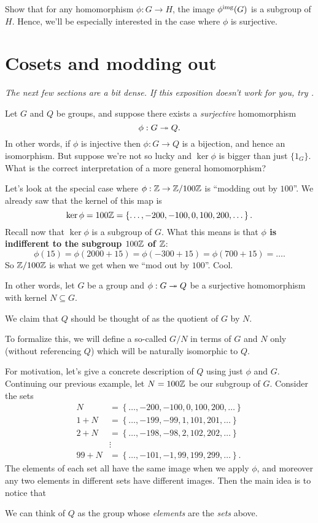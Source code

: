 \begin{ques}
	Show that for any homomorphism $\phi: G \to H$,
	the image $\phi^{\text{img}}(G)$ is a subgroup of $H$.
	Hence, we'll be especially interested in the case where $\phi$ is surjective.
\end{ques}

\section{Cosets and modding out}
\emph{The next few sections are a bit dense.
If this exposition doesn't work for you, try \cite{ref:gowers}.}

Let $G$ and $Q$ be groups, and suppose there exists
a \emph{surjective} homomorphism \[ \phi : G \twoheadrightarrow Q. \]
In other words, if $\phi$ is injective then $\phi : G \to Q$ is a bijection,
and hence an isomorphism.
But suppose we're not so lucky and $\ker\phi$ is bigger than just $\{1_G\}$.
What is the correct interpretation of a more general homomorphism?

Let's look at the special case where $\phi : \mathbb Z \to \mathbb Z/100\mathbb Z$ is ``modding out by $100$''.
We already saw that the kernel of this map is
\[ 
	\ker \phi = 100\mathbb Z = \left\{ \dots, -200, -100, 0, 100, 200, \dots  \right\}.
\]
Recall now that $\ker \phi$ is a subgroup of $G$.
What this means is that \textbf{$\phi$ is indifferent to the subgroup $100\mathbb Z$ of $\mathbb Z$}:
\[ \phi(15) = \phi(2000 + 15) = \phi(-300 + 15) = \phi(700 + 15) = \dots. \]
So $\mathbb Z/100\mathbb Z$ is what we get when we ``mod out by $100$''. Cool.

In other words, let $G$ be a group and $\phi : G \twoheadrightarrow Q$
be a surjective homomorphism with kernel $N \subseteq G$.
\begin{moral}
	We claim that $Q$ should be thought of as the quotient of $G$ by $N$.
\end{moral}
To formalize this, we will define a so-called
 $G/N$
in terms of $G$ and $N$ only (without referencing $Q$)
which will be naturally isomorphic to $Q$.

For motivation, let's give a concrete description of $Q$ using just $\phi$ and $G$.
Continuing our previous example, let $N = 100\mathbb Z$ be our subgroup of $G$.
Consider the sets
\begin{align*}
	N &= \left\{ \dots, -200, -100, 0, 100, 200, \dots \right\} \\
	1+N &= \left\{ \dots, -199, -99, 1, 101, 201, \dots \right\} \\
	2+N &= \left\{ \dots, -198, -98, 2, 102, 202, \dots \right\} \\
	&\vdots \\
	99+N &= \left\{ \dots, -101, -1, 99, 199, 299, \dots \right\}.
\end{align*}
The elements of each set all have the same image when we apply $\phi$,
and moreover any two elements in different sets have different images.
Then the main idea is to notice that
\begin{moral}
	We can think of $Q$ as the group
	whose \emph{elements} are the \emph{sets} above.
\end{moral}

